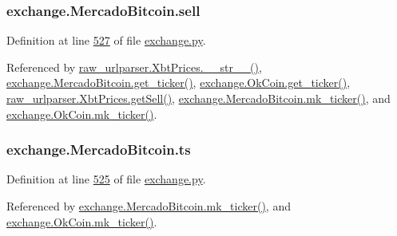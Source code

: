 \subsubsection[{\texorpdfstring{sell}{sell}}]{\setlength{\rightskip}{0pt plus 5cm}exchange.\+Mercado\+Bitcoin.\+sell}\hypertarget{classexchange_1_1_mercado_bitcoin_a9982c7a3f6103c88c64160a5854c35cd}{}\label{classexchange_1_1_mercado_bitcoin_a9982c7a3f6103c88c64160a5854c35cd}


Definition at line \hyperlink{exchange_8py_source_l00527}{527} of file \hyperlink{exchange_8py_source}{exchange.\+py}.



Referenced by \hyperlink{raw__urlparser_8py_source_l00074}{raw\+\_\+urlparser.\+Xbt\+Prices.\+\_\+\+\_\+str\+\_\+\+\_\+()}, \hyperlink{exchange_8py_source_l00535}{exchange.\+Mercado\+Bitcoin.\+get\+\_\+ticker()}, \hyperlink{exchange_8py_source_l00600}{exchange.\+Ok\+Coin.\+get\+\_\+ticker()}, \hyperlink{raw__urlparser_8py_source_l00065}{raw\+\_\+urlparser.\+Xbt\+Prices.\+get\+Sell()}, \hyperlink{exchange_8py_source_l00549}{exchange.\+Mercado\+Bitcoin.\+mk\+\_\+ticker()}, and \hyperlink{exchange_8py_source_l00614}{exchange.\+Ok\+Coin.\+mk\+\_\+ticker()}.

\subsubsection[{\texorpdfstring{ts}{ts}}]{\setlength{\rightskip}{0pt plus 5cm}exchange.\+Mercado\+Bitcoin.\+ts}\hypertarget{classexchange_1_1_mercado_bitcoin_ac4630b08e08f9eeb9dad838dc9dc0cda}{}\label{classexchange_1_1_mercado_bitcoin_ac4630b08e08f9eeb9dad838dc9dc0cda}


Definition at line \hyperlink{exchange_8py_source_l00525}{525} of file \hyperlink{exchange_8py_source}{exchange.\+py}.



Referenced by \hyperlink{exchange_8py_source_l00549}{exchange.\+Mercado\+Bitcoin.\+mk\+\_\+ticker()}, and \hyperlink{exchange_8py_source_l00614}{exchange.\+Ok\+Coin.\+mk\+\_\+ticker()}.

